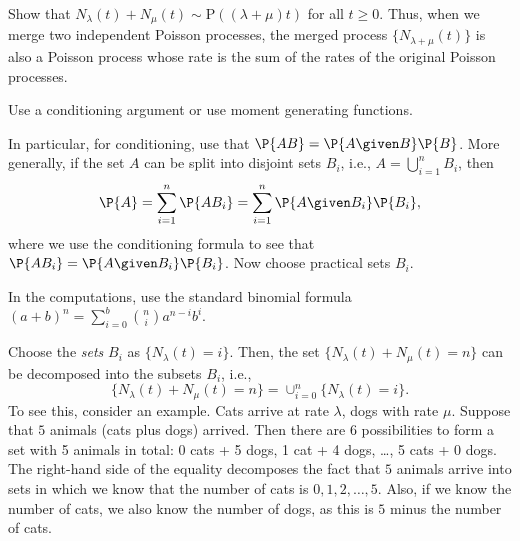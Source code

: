 \begin{exercise} 
Show that  $N_\lambda(t) + N_\mu(t) \sim \text{P}((\lambda + \mu)t)$ for all $t\geq 0$. Thus, when we merge two independent Poisson processes, the merged process $\{N_{\lambda+\mu}(t)\}$ is also a Poisson process whose rate is the sum of the rates of the original Poisson processes.
  \begin{hint}
Use a conditioning argument or use moment generating functions.

In particular, for
    conditioning, use that $\P{AB} = \P{A\given B}\P{B}$. More
    generally, if the set $A$ can be split into disjoint sets $B_i$,
    i.e., $A=\bigcup_{i=1}^n B_i$, then
    \begin{equation*}
      \P{A} = \sum_{i=1}^n \P{A B_i} = \sum_{i=1}^n \P{A\given B_i} \P{B_i},
    \end{equation*}
    where we use the conditioning formula to see that
    $\P{A B_i} = \P{A \given B_i} \P{B_i}$.  Now choose practical sets
    $B_i$.  

In the computations, use the standard binomial formula $(a+b)^n = \sum_{i=0}^b {n \choose i} a^{n-i} b^i$. 
  \end{hint}
    \begin{solution}
Choose the \emph{sets} $B_i$ as $\{N_\lambda(t) = i\}$. Then, the set $\{N_\lambda(t) + N_\mu(t) = n\}$ can be decomposed into the subsets $B_i$, i.e., 
\begin{equation*}
\{N_\lambda(t) + N_\mu(t) = n\} =  \cup_{i=0}^n \{N_\lambda(t) = i\}.
\end{equation*}
To see this, consider an example. Cats arrive at rate $\lambda$, dogs with rate $\mu$. Suppose that $5$ animals (cats plus dogs) arrived. Then  there are 6 possibilities to form a set with 5 animals in total: 0 cats + 5 dogs, 1 cat + 4 dogs, \ldots, 5 cats + 0 dogs. The right-hand side of the equality decomposes  the fact that $5$ animals arrive into sets in which we know that the number of cats is $0, 1, 2,\ldots, 5$. Also,  if we know the number of cats, we also know the number of dogs, as this is $5$ minus the number of cats. %


\end{solution}
\end{exercise}
